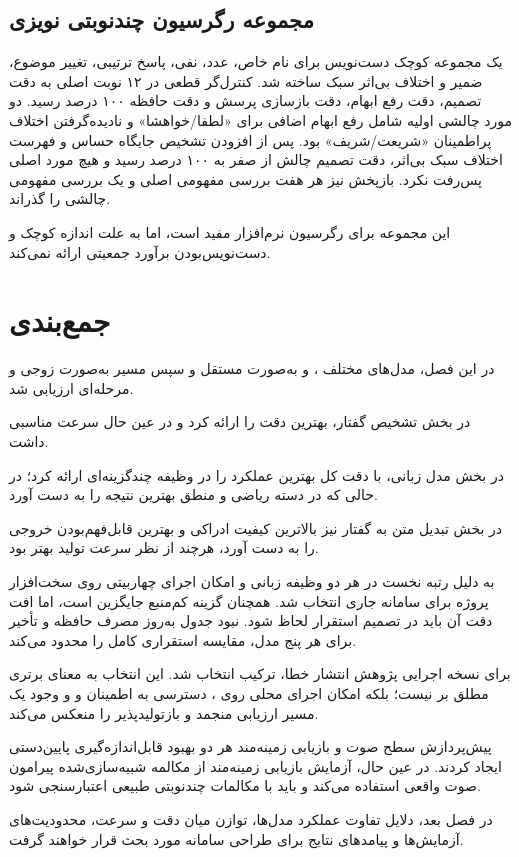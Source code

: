 \subsection{مجموعه رگرسیون چندنوبتی نویزی}

یک مجموعه کوچک دست‌نویس برای نام خاص، عدد، نفی، پاسخ ترتیبی،
تغییر موضوع، ضمیر و اختلاف بی‌اثر سبک ساخته شد. کنترل‌گر قطعی
در ۱۲ نوبت اصلی به دقت تصمیم، دقت رفع ابهام، دقت بازسازی پرسش
و دقت حافظه ۱۰۰ درصد رسید. دو مورد چالشی اولیه شامل رفع ابهام
اضافی برای «لطفا/خواهشا» و نادیده‌گرفتن اختلاف پر‌اطمینان
«شریعت/شریف» بود. پس از افزودن تشخیص جایگاه حساس و فهرست
اختلاف سبک بی‌اثر، دقت تصمیم چالش از صفر به ۱۰۰ درصد رسید و
هیچ مورد اصلی پس‌رفت نکرد. بازپخش  نیز هر هفت
بررسی مفهومی اصلی و یک بررسی مفهومی چالشی را گذراند.

این مجموعه برای رگرسیون نرم‌افزار مفید است، اما به علت اندازه
کوچک و دست‌نویس‌بودن برآورد جمعیتی ارائه نمی‌کند.
\section{جمع‌بندی}

در این فصل، مدل‌های مختلف ،  و  به‌صورت مستقل
و سپس مسیر  به‌صورت زوجی و مرحله‌ای ارزیابی شد.

در بخش تشخیص گفتار،  بهترین دقت را
ارائه کرد و در عین حال سرعت مناسبی داشت.

در بخش مدل زبانی،  با دقت کل  بهترین
عملکرد را در وظیفه چندگزینه‌ای  ارائه کرد؛ در حالی که
 در دسته ریاضی و منطق بهترین نتیجه را به دست آورد.

در بخش تبدیل متن به گفتار نیز  بالاترین کیفیت ادراکی و
بهترین قابل‌فهم‌بودن خروجی را به دست آورد، هرچند  از نظر
سرعت تولید بهتر بود.

 به دلیل رتبه نخست در هر دو وظیفه زبانی و امکان
اجرای چهاربیتی روی سخت‌افزار پروژه برای سامانه جاری انتخاب شد.
 همچنان گزینه کم‌منبع جایگزین است، اما افت دقت
آن باید در تصمیم استقرار لحاظ شود. نبود جدول به‌روز مصرف حافظه
و تأخیر برای هر پنج مدل، مقایسه استقراری کامل را محدود می‌کند.

برای نسخه اجرایی پژوهش انتشار خطا، ترکیب
 انتخاب شد. این انتخاب به معنای
برتری مطلق  بر  نیست؛ بلکه امکان اجرای
محلی روی ، دسترسی به اطمینان و  و وجود یک
مسیر ارزیابی منجمد و بازتولیدپذیر را منعکس می‌کند.

پیش‌پردازش سطح صوت و بازیابی زمینه‌مند هر دو بهبود قابل‌اندازه‌گیری
پایین‌دستی ایجاد کردند. در عین حال، آزمایش بازیابی زمینه‌مند از
مکالمه شبیه‌سازی‌شده پیرامون صوت واقعی استفاده می‌کند و باید با
مکالمات چندنوبتی طبیعی اعتبارسنجی شود.

در فصل بعد، دلایل تفاوت عملکرد مدل‌ها، توازن میان دقت و سرعت،
محدودیت‌های آزمایش‌ها و پیامدهای نتایج برای طراحی سامانه
مورد بحث قرار خواهند گرفت.
